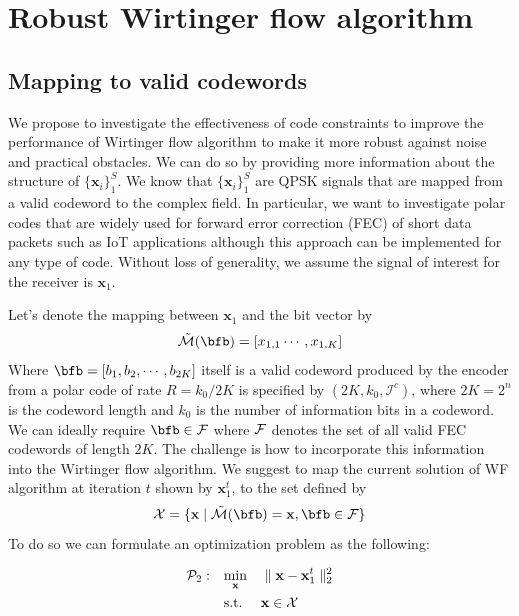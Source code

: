 \section{Robust Wirtinger flow algorithm}

\subsection{Mapping to valid codewords}

We propose to investigate the effectiveness of code constraints to improve the performance of Wirtinger flow algorithm 
to make it more robust against noise and practical obstacles.
We can do so by providing more information about the structure of $\{\mathbf{x}_i\}_1^S$. We know that $\{\mathbf{x}_i\}_1^S$
are QPSK signals that are mapped from a valid codeword to the complex field. In particular, we want to investigate polar codes that 
are widely used for  forward error correction (FEC) of short data packets such as IoT applications although this approach can
be implemented for any type of code. Without loss of generality, we assume the signal of interest for the receiver is $\mathbf{x}_1$.

Let's denote the mapping between $\mathbf{x}_1$ and the bit vector by 
$$ {\cal \tilde{M}}(\bfb)=[x_{1,1}\cdots, x_{1,K} ]$$
Where  $\bfb = [b_1, b_2, \cdots, b_{2K}]$ itself is a valid codeword produced by the encoder from  
a polar code of rate $R = k_0 / 2K$ is specified by 
$(2K, k_0, \mathcal{I}^c)$, where $2K = 2^n$ is the codeword 
length and $k_0$ is the number of information bits in a 
codeword. We can ideally require $\bfb\in {\cal F}$ where ${\cal F}$ denotes the set of all valid FEC codewords of 
length $2K$. The challenge is how to incorporate this information into the Wirtinger flow algorithm. We suggest to map the 
current solution of WF algorithm at iteration $t$ shown by $\mathbf{x}_1^t$, to the set defined by $$\cal X = \{\mathbf{x} \mid  \cal{\tilde{M}}(\bfb) = \mathbf{x}, \bfb\in {\cal F}\}$$
To do so we can formulate an optimization problem as the following:

\begin{equation}
\begin{aligned}
\mathcal{P}_2: \quad &\underset{\mathbf{x}} {\text{min}} &&\parallel \mathbf{x} - \mathbf{x}_1^t \parallel_2^2\\
                                  &\text{s.t.} &&\mathbf{x} \in \cal X\\
\end{aligned}
\end{equation}

